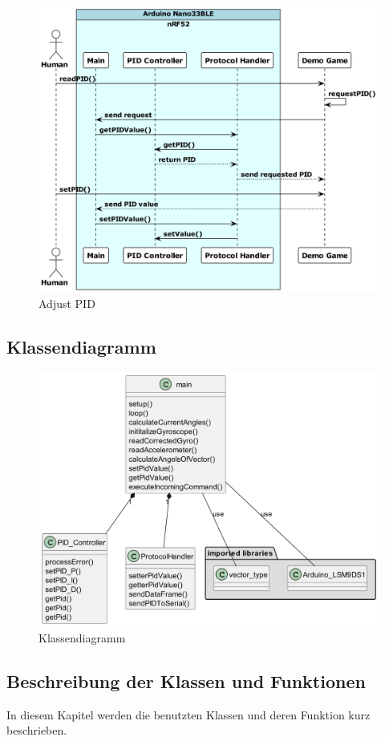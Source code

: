 \begin{figure}[H]
  \begin{center}
    \includegraphics[width=0.7\linewidth]{content/diagrams/out/sequence/adjustPID.png}
    \caption{Adjust PID}
  \end{center}
\end{figure}

\subsection{Klassendiagramm}
\begin{figure}[H]
  \begin{center}
    \includegraphics[width=0.8\linewidth]{content/diagrams/out/class/classdiagram.png}
    \caption{Klassendiagramm}
  \end{center}
\end{figure}

\subsection{Beschreibung der Klassen und Funktionen}
In diesem Kapitel werden die benutzten Klassen und deren Funktion kurz beschrieben.
